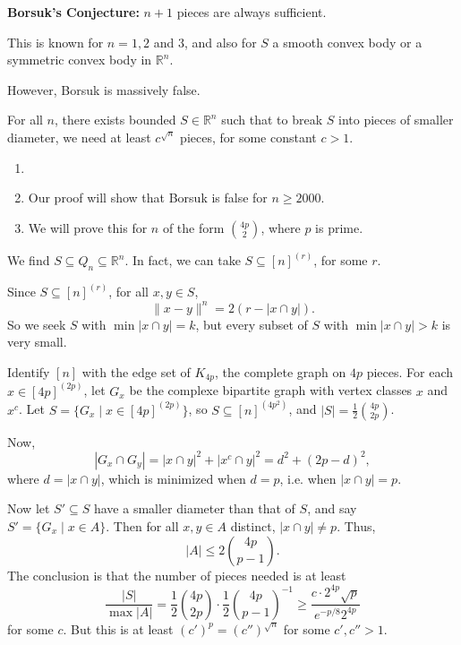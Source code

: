 \documentclass[12pt]{article}
\begin{document}
\textbf{Borsuk's Conjecture:} $n + 1$ pieces are always sufficient.

This is known for $n = 1, 2$ and $3$, and also for $S$ a smooth convex body or a symmetric convex body in $\mathbb{R}^n$.

However, Borsuk is massively false.

\begin{theorem}
	For all $n$, there exists bounded $S \in \mathbb{R}^n$ such that to break $S$ into pieces of smaller diameter, we need at least $c^{\sqrt n}$ pieces, for some constant $c > 1$.
\end{theorem}

\begin{remark}
	\begin{enumerate}
		\item[]
		\item Our proof will show that Borsuk is false for $n \geq 2000$.
		\item We will prove this for $n$ of the form $\binom{4p}{2}$, where $p$ is prime.
	\end{enumerate}
\end{remark}

\begin{proofbox}
	We find $S \subseteq Q_n \subseteq \mathbb{R}^n$. In fact, we can take $S \subseteq [n]^{(r)}$, for some $r$.

	Since $S \subseteq [n]^{(r)}$, for all $x, y \in S$,
	\[
	\|x-y\|^n = 2 (r - |x \cap y|).
	\]
	So we seek $S$ with $\min |x \cap y| = k$, but every subset of $S$ with $\min |x \cap y| > k$ is very small.

	Identify $[n]$ with the edge set of $K_{4p}$, the complete graph on $4p$ pieces. For each $x \in [4p]^{(2p)}$, let $G_x$ be the complexe bipartite graph with vertex classes $x$ and $x^{c}$. Let $S = \{G_x \mid x \in [4p]^{(2p)}\}$, so $S \subseteq [n]^{(4p^2)}$, and $|S| = \frac 12 \binom{4p}{2p}$.

	Now,
	\[
	|G_x \cap G_y| = |x \cap y|^2 + |x^{c} \cap y|^2 = d^2 + (2p - d)^2,
	\]
	where $d = |x \cap y|$, which is minimized when $d = p$, i.e. when $|x \cap y| = p$.

	Now let $S' \subseteq S$ have a smaller diameter than that of $S$, and say $S' = \{G_x \mid x \in A\}$. Then for all $x, y \in A$ distinct, $|x \cap y| \neq p$. Thus,
	\[
		|A| \leq 2 \binom{4p}{p-1}.
	\]
	The conclusion is that the number of pieces needed is at least
	\[
		\frac{|S|}{\max |A|} = \frac 12 \binom{4p}{2p} \cdot \frac 12 \binom{4p}{p-1}^{-1} \geq \frac{c \cdot 2^{4p}\sqrt p}{e^{-p/8}2^{4p}}
	\]
	for some $c$. But this is at least $(c')^{p} = (c'')^{\sqrt n}$ for some $c', c'' > 1$.
\end{proofbox}


\newpage

\printindex
\end{document}
